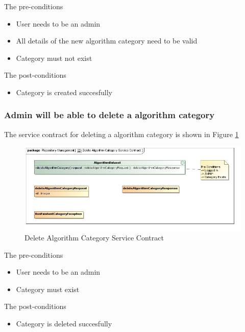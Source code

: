 The pre-conditions
\begin{itemize}
  \item User needs to be an admin
  \item All details of the new algorithm category need to be valid
  \item Category must not exist
\end{itemize}

The post-conditions
\begin{itemize}
  \item Category is created succesfully
\end{itemize}

\subsubsection {Admin will be able to delete a algorithm category}

The service contract for deleting a algorithm category is shown in Figure \ref{fig:deleteAlgorithmCatService}
\begin{figure}[H]
  \begin{center}
  \includegraphics[scale=0.6]{../Diagrams and Charts/Test Data/Delete Algorithm Category Service Contract.jpg}
  \caption{Delete Algorithm Category Service Contract}
  \end{center}
  \label{fig:deleteAlgorithmCatService}
\end{figure}

The pre-conditions
\begin{itemize}
  \item User needs to be an admin
  \item Category must exist
\end{itemize}

The post-conditions
\begin{itemize}
  \item Category is deleted succesfully
\end{itemize}

